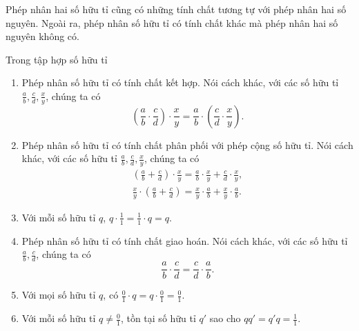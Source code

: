 Phép nhân hai số hữu tỉ cũng có những tính chất tương tự với phép nhân hai số nguyên. Ngoài ra, phép nhân số hữu tỉ có tính chất khác mà phép nhân hai số nguyên không có.
\begin{theorem}\label{theorem:property-of-rational-numbers-multiplication}
	Trong tập hợp số hữu tỉ
	\begin{enumerate}[label={(\roman*)}]
		\item Phép nhân số hữu tỉ có tính chất kết hợp. Nói cách khác, với các số hữu tỉ $\frac{a}{b}, \frac{c}{d}, \frac{x}{y}$, chúng ta có
		      \[
			      \left(\frac{a}{b}\cdot\frac{c}{d}\right)\cdot\frac{x}{y} = \frac{a}{b}\cdot\left(\frac{c}{d}\cdot\frac{x}{y}\right).
		      \]
		\item Phép nhân số hữu tỉ có tính chất phân phối với phép cộng số hữu tỉ. Nói cách khác, với các số hữu tỉ $\frac{a}{b}, \frac{c}{d}, \frac{x}{y}$, chúng ta có
		      \[
			      \begin{split}
				      \left(\frac{a}{b} + \frac{c}{d}\right)\cdot\frac{x}{y} = \frac{a}{b}\cdot\frac{x}{y} + \frac{c}{d}\cdot\frac{x}{y}, \\
				      \frac{x}{y}\cdot\left(\frac{a}{b} + \frac{c}{d}\right) = \frac{x}{y}\cdot\frac{a}{b} + \frac{x}{y}\cdot\frac{a}{b}.
			      \end{split}
		      \]
		\item Với mỗi số hữu tỉ $q$, $q\cdot \frac{1}{1} = \frac{1}{1}\cdot q = q$.
		\item Phép nhân số hữu tỉ có tính chất giao hoán. Nói cách khác, với các số hữu tỉ $\frac{a}{b}, \frac{c}{d}$, chúng ta có
		      \[
			      \frac{a}{b}\cdot\frac{c}{d} = \frac{c}{d}\cdot\frac{a}{b}.
		      \]
		\item Với mọi số hữu tỉ $q$, có $\frac{0}{1}\cdot q = q\cdot\frac{0}{1} = \frac{0}{1}$.
		\item Với mỗi số hữu tỉ $q\ne \frac{0}{1}$, tồn tại số hữu tỉ $q'$ sao cho $qq' = q'q = \frac{1}{1}$.
	\end{enumerate}
\end{theorem}

